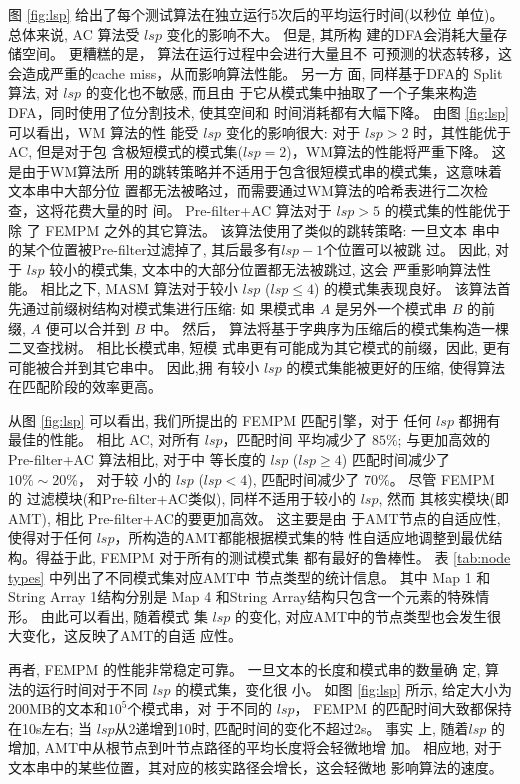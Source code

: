 图 \ref{fig:lsp} 给出了每个测试算法在独立运行5次后的平均运行时间(以秒位
单位)。 总体来说, \textsf{AC} 算法受 $lsp$ 变化的影响不大。 但是, 其所构
建的DFA会消耗大量存储空间。 更糟糕的是， 算法在运行过程中会进行大量且不
可预测的状态转移，这会造成严重的cache miss，从而影响算法性能。 另一方
面, 同样基于DFA的 \textsf{Split} 算法, 对 $lsp$ 的变化也不敏感, 而且由
于它从模式集中抽取了一个子集来构造DFA，同时使用了位分割技术, 使其空间和
时间消耗都有大幅下降。 由图 \ref{fig:lsp} 可以看出，\textsf{WM} 算法的性
能受 $lsp$ 变化的影响很大: 对于 $lsp > 2$ 时，其性能优于AC, 但是对于包
含极短模式的模式集($lsp=2$)，WM算法的性能将严重下降。 这是由于WM算法所
用的跳转策略并不适用于包含很短模式串的模式集，这意味着文本串中大部分位
置都无法被略过，而需要通过WM算法的哈希表进行二次检查，这将花费大量的时
间。  \textsf{Pre-filter+AC} 算法对于 $lsp > 5$ 的模式集的性能优于除
了 \textsf{FEMPM} 之外的其它算法。 该算法使用了类似的跳转策略: 一旦文本
串中的某个位置被Pre-filter过滤掉了, 其后最多有$lsp-1$个位置可以被跳
过。 因此, 对于 $lsp$ 较小的模式集, 文本中的大部分位置都无法被跳过, 这会
严重影响算法性能。 相比之下, \textsf{MASM} 算法对于较小 $lsp$ ($lsp
\leq 4$) 的模式集表现良好。 该算法首先通过前缀树结构对模式集进行压缩: 如
果模式串 $A$ 是另外一个模式串 $B$ 的前缀, $A$ 便可以合并到 $B$ 中。 然后，
算法将基于字典序为压缩后的模式集构造一棵二叉查找树。 相比长模式串, 短模
式串更有可能成为其它模式的前缀，因此, 更有可能被合并到其它串中。 因此,拥
有较小 $lsp$ 的模式集能被更好的压缩, 使得算法在匹配阶段的效率更高。

从图 \ref{fig:lsp} 可以看出, 我们所提出的 \textsf{FEMPM} 匹配引擎，对于
任何 $lsp$ 都拥有最佳的性能。 相比 \textsf{AC}, 对所有 $lsp$，匹配时间
平均减少了 $85\%$; 与更加高效的\textsf{Pre-filter+AC} 算法相比, 对于中
等长度的 $lsp$ ($lsp \geq 4$) 匹配时间减少了 $10\% \sim 20\%$， 对于较
小的 $lsp$ ($lsp < 4$), 匹配时间减少了 $70\%$。 尽管 \textsf{FEMPM} 的
过滤模块(和\textsf{Pre-filter+AC}类似), 同样不适用于较小的 $lsp$, 然而
其核实模块(即AMT), 相比 \textsf{Pre-filter+AC}的要更加高效。 这主要是由
于AMT节点的自适应性, 使得对于任何 $lsp$，所构造的AMT都能根据模式集的特
性自适应地调整到最优结构。得益于此, \textsf{FEMPM} 对于所有的测试模式集
都有最好的鲁棒性。 表 \ref{tab:node types} 中列出了不同模式集对应AMT中
节点类型的统计信息。 其中 Map 1 和 String Array 1结构分别是 Map
4 和String Array结构只包含一个元素的特殊情形。 由此可以看出, 随着模式
集 $lsp$ 的变化, 对应AMT中的节点类型也会发生很大变化，这反映了AMT的自适
应性。

再者, \textsf{FEMPM} 的性能非常稳定可靠。 一旦文本的长度和模式串的数量确
定, 算法的运行时间对于不同 $lsp$ 的模式集，变化很
小。 如图 \ref{fig:lsp} 所示, 给定大小为200MB的文本和$10^5$个模式串，对
于不同的 $lsp$， \textsf{FEMPM} 的匹配时间大致都保持
在10s左右; 当 $lsp$从2递增到10时, 匹配时间的变化不超过2s。 事实
上, 随着$lsp$ 的增加, AMT中从根节点到叶节点路径的平均长度将会轻微地增
加。 相应地, 对于文本串中的某些位置，其对应的核实路径会增长，这会轻微地
影响算法的速度。

